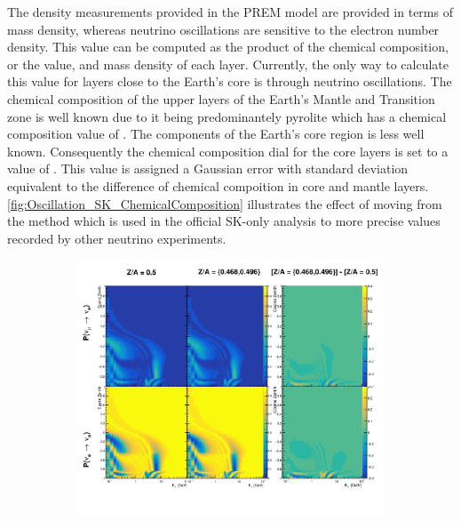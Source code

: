 The density measurements provided in the PREM model are provided in terms of mass density, whereas neutrino oscillations are sensitive to the electron number density. This value can be computed as the product of the chemical composition, or the  value, and mass density of each layer. Currently, the only way to calculate this value for layers close to the Earth's core is through neutrino oscillations. The chemical composition of the upper layers of the Earth's Mantle and Transition zone is well known due to it being predominantely pyrolite which has a chemical composition value of  \cite{Bourret_2017}. The components of the Earth's core region is less well known. Consequently the chemical composition dial for the core layers is set to a value of  \cite{Rott2015}. This value is assigned a Gaussian error with standard deviation equivalent to the difference of chemical compoition in core and mantle layers. \autoref{fig:Oscillation_SK_ChemicalComposition} illustrates the effect of moving from the  method which is used in the official SK-only analysis \cite{thesis_roger} to more precise values recorded by other neutrino experiments.

\begin{figure}[h]
  \begin{subfigure}[t]{\textwidth}
    \includegraphics[width=\textwidth, trim={0mm 0mm 0mm 0mm}, clip,page=1]{Figures/Oscillation/ChemicalComposition.pdf}
  \end{subfigure}
  \caption{}
  \label{fig:Oscillation_SK_ChemicalComposition}
\end{figure}

